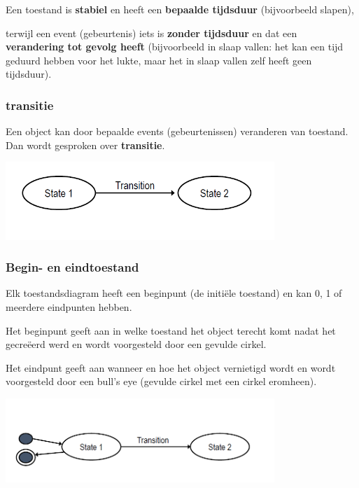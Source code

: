 Een toestand is \textbf{stabiel} en heeft een \textbf{bepaalde tijdsduur} (bijvoorbeeld slapen), 

terwijl een event (gebeurtenis) iets is \textbf{zonder tijdsduur} en dat een \textbf{verandering tot gevolg heeft} (bijvoorbeeld in slaap vallen: het kan een tijd geduurd hebben voor het lukte, maar het in slaap vallen zelf heeft geen tijdsduur).

\subsubsection{transitie}

Een object kan door bepaalde events (gebeurtenissen) veranderen van toestand. Dan wordt gesproken over \textbf{transitie}.


\begin{center}
\includegraphics[width=4in]{img/state1}%
\end{center}

\subsubsection{Begin- en eindtoestand}

Elk toestandsdiagram heeft een beginpunt (de initiële toestand) en kan 0, 1 of meerdere eindpunten hebben.

Het beginpunt geeft aan in welke toestand het object terecht komt nadat het gecreëerd werd en wordt voorgesteld door een gevulde cirkel.

Het eindpunt geeft aan wanneer en hoe het object vernietigd wordt en wordt voorgesteld door een bull's eye (gevulde cirkel met een cirkel eromheen).


\begin{center}
\includegraphics[width=4in]{img/state3}%
\end{center}

